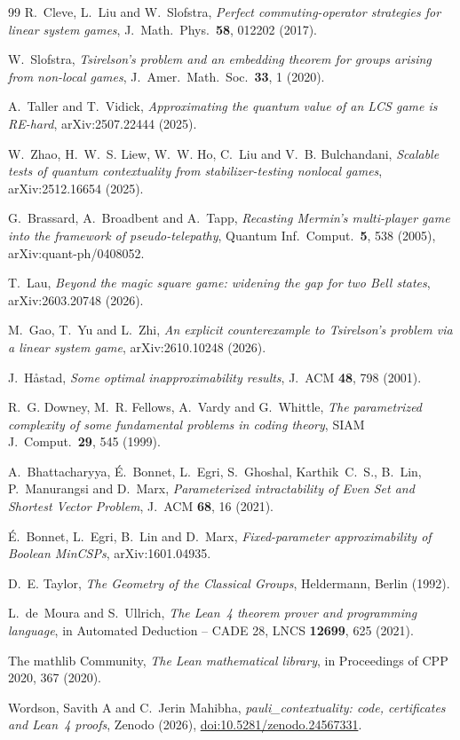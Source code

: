 \documentclass[a4paper,onecolumn,11pt,unpublished,nopdfoutputerror]{quantumarticle}
\theoremstyle{definition}
\begin{document}
\begin{thebibliography}{99}
 R.~Cleve, L.~Liu and W.~Slofstra, \emph{Perfect commuting-operator strategies for linear
system games}, J.\ Math.\ Phys.\ \textbf{58}, 012202 (2017).

 W.~Slofstra, \emph{Tsirelson's problem and an embedding theorem for groups arising from
non-local games}, J.\ Amer.\ Math.\ Soc.\ \textbf{33}, 1 (2020).

 A.~Taller and T.~Vidick, \emph{Approximating the quantum value of an LCS game is RE-hard},
arXiv:2507.22444 (2025).

 W.~Zhao, H.~W.~S. Liew, W.~W. Ho, C.~Liu and V.~B. Bulchandani, \emph{Scalable tests of quantum
contextuality from stabilizer-testing nonlocal games}, arXiv:2512.16654 (2025).

 G.~Brassard, A.~Broadbent and A.~Tapp, \emph{Recasting Mermin's multi-player game into the
framework of pseudo-telepathy}, Quantum Inf.\ Comput.\ \textbf{5}, 538 (2005), arXiv:quant-ph/0408052.

 T.~Lau, \emph{Beyond the magic square game: widening the gap for two Bell states}, arXiv:2603.20748 (2026).

 M.~Gao, T.~Yu and L.~Zhi, \emph{An explicit counterexample to Tsirelson's problem via a linear system game},
arXiv:2610.10248 (2026).

 J.~H{\aa}stad, \emph{Some optimal inapproximability results}, J.\ ACM \textbf{48}, 798 (2001).

 R.~G. Downey, M.~R. Fellows, A.~Vardy and G.~Whittle, \emph{The parametrized complexity of some
fundamental problems in coding theory}, SIAM J.\ Comput.\ \textbf{29}, 545 (1999).

 A.~Bhattacharyya, \'E.~Bonnet, L.~Egri, S.~Ghoshal, Karthik~C.~S., B.~Lin, P.~Manurangsi and
D.~Marx, \emph{Parameterized intractability of Even Set and Shortest Vector Problem}, J.\ ACM \textbf{68}, 16 (2021).

 \'E.~Bonnet, L.~Egri, B.~Lin and D.~Marx, \emph{Fixed-parameter approximability of
Boolean MinCSPs}, arXiv:1601.04935.

 D.~E. Taylor, \emph{The Geometry of the Classical Groups}, Heldermann, Berlin (1992).

 L.~de~Moura and S.~Ullrich, \emph{The Lean~4 theorem prover and programming language}, in Automated
Deduction -- CADE 28, LNCS \textbf{12699}, 625 (2021).

 The mathlib Community, \emph{The Lean mathematical library}, in Proceedings of CPP 2020, 367
(2020).

 Wordson, Savith A and C.~Jerin Mahibha, \emph{pauli\_contextuality: code, certificates and
Lean~4 proofs}, Zenodo (2026), \href{https://doi.org/10.5281/zenodo.24567331}{doi:10.5281/zenodo.24567331}.

\end{thebibliography}
\end{document}
